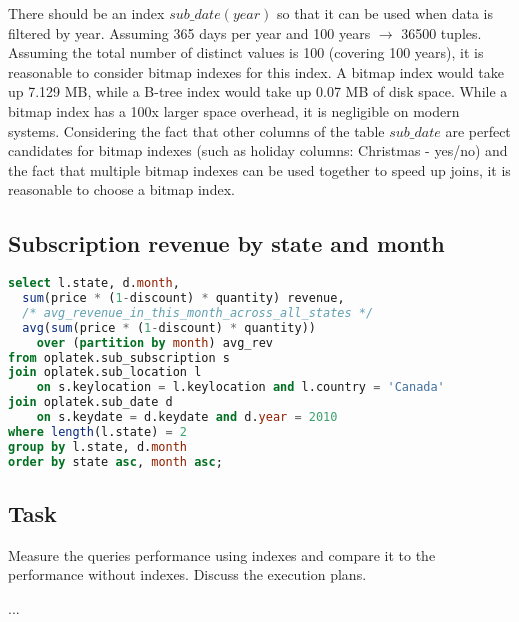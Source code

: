 There should be an index $sub\_date(year)$ so that it can be used when data is filtered by year. Assuming 365 days per year and 100 years $\rightarrow$ 36500 tuples. Assuming the total number of distinct values is 100 (covering 100 years), it is reasonable to consider bitmap indexes for this index. A bitmap index would take up 7.129 MB, while a B-tree index would take up 0.07 MB of disk space. While a bitmap index has a 100x larger space overhead, it is negligible on modern systems. Considering the fact that other columns of the table $sub\_date$ are perfect candidates for bitmap indexes (such as holiday columns: Christmas - yes/no) and the fact that multiple bitmap indexes can be used together to speed up joins, it is reasonable to choose a bitmap index.

\subsection*{Subscription revenue by state and month} 
\begin{lstlisting}[language=sql] 
select l.state, d.month, 
  sum(price * (1-discount) * quantity) revenue,
  /* avg_revenue_in_this_month_across_all_states */
  avg(sum(price * (1-discount) * quantity)) 
    over (partition by month) avg_rev 
from oplatek.sub_subscription s 
join oplatek.sub_location l 
    on s.keylocation = l.keylocation and l.country = 'Canada' 
join oplatek.sub_date d 
    on s.keydate = d.keydate and d.year = 2010
where length(l.state) = 2
group by l.state, d.month
order by state asc, month asc;
\end{lstlisting}

\subsection*{Task} 
Measure the queries performance using indexes and compare it to the
performance without indexes. Discuss the execution plans.\newline

\noindent ...